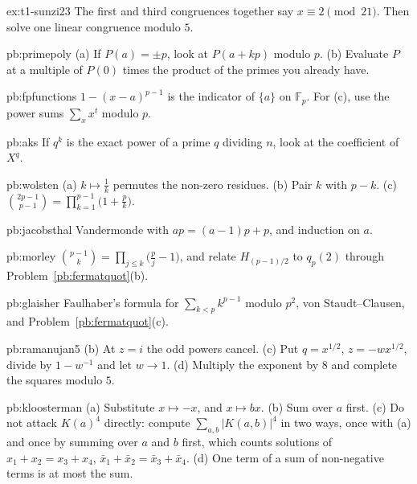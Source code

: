 \begin{hint}{ex:t1-sunzi23}
The first and third congruences together say $x\equiv 2\pmod{21}$. Then solve one linear congruence modulo $5$.
\end{hint}

\begin{hint}{pb:primepoly}
(a) If $P(a)=\pm p$, look at $P(a+kp)$ modulo $p$. (b) Evaluate $P$ at a multiple of $P(0)$ times the product of the primes
you already have.
\end{hint}

\begin{hint}{pb:fpfunctions}
$1-(x-a)^{p-1}$ is the indicator of $\{a\}$ on $\mathbb F_p$. For (c), use the power sums $\sum_xx^t$ modulo $p$.
\end{hint}

\begin{hint}{pb:aks}
If $q^k$ is the exact power of a prime $q$ dividing $n$, look at the coefficient of $X^q$.
\end{hint}

\begin{hint}{pb:wolsten}
(a) $k\mapsto\frac1k$ permutes the non-zero residues. (b) Pair $k$ with $p-k$. (c) $\binom{2p-1}{p-1}=\prod_{k=1}^{p-1}\bigl(1+\frac pk\bigr)$.
\end{hint}

\begin{hint}{pb:jacobsthal}
Vandermonde with $ap=(a-1)p+p$, and induction on $a$.
\end{hint}

\begin{hint}{pb:morley}
$\binom{p-1}k=\prod_{j\le k}\bigl(\frac pj-1\bigr)$, and relate $H_{(p-1)/2}$ to $q_p(2)$ through Problem~\ref{pb:fermatquot}(b).
\end{hint}

\begin{hint}{pb:glaisher}
Faulhaber's formula for $\sum_{k<p}k^{p-1}$ modulo $p^2$, von Staudt--Clausen, and Problem~\ref{pb:fermatquot}(c).
\end{hint}

\begin{hint}{pb:ramanujan5}
(b) At $z=i$ the odd powers cancel. (c) Put $q=x^{1/2}$, $z=-wx^{1/2}$, divide by $1-w^{-1}$ and let $w\to1$. (d) Multiply the
exponent by $8$ and complete the squares modulo $5$.
\end{hint}

\begin{hint}{pb:kloosterman}
(a) Substitute $x\mapsto-x$, and $x\mapsto bx$. (b) Sum over $a$ first. (c) Do not attack $K(a)^4$ directly: compute $\sum_{a,b}|K(a,b)|^4$ in two
ways, once with (a) and once by summing over $a$ and $b$ first, which counts solutions of $x_1+x_2=x_3+x_4$, $\bar x_1+\bar x_2=\bar x_3+\bar x_4$.
(d) One term of a sum of non-negative terms is at most the sum.
\end{hint}

